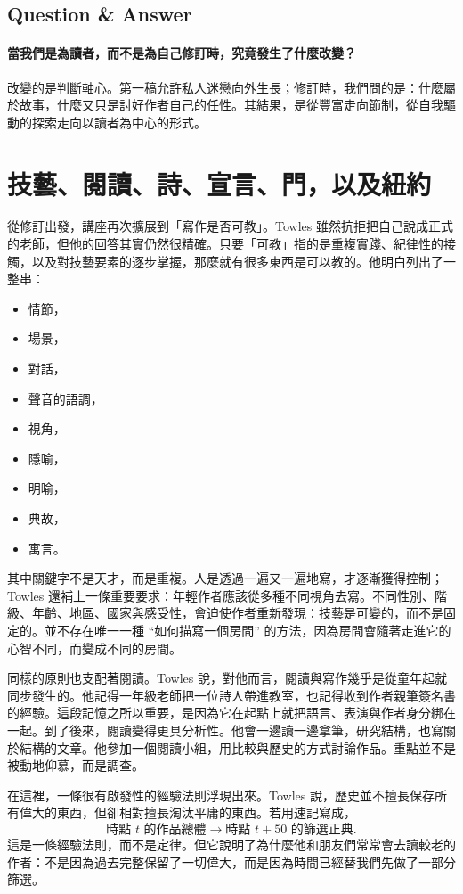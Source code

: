 \subsection{Question \& Answer}

\paragraph{當我們是為讀者，而不是為自己修訂時，究竟發生了什麼改變？}

改變的是判斷軸心。第一稿允許私人迷戀向外生長；修訂時，我們問的是：什麼屬於故事，什麼又只是討好作者自己的任性。其結果，是從豐富走向節制，從自我驅動的探索走向以讀者為中心的形式。

\section{技藝、閱讀、詩、宣言、門，以及紐約}

從修訂出發，講座再次擴展到「寫作是否可教」。Towles 雖然抗拒把自己說成正式的老師，但他的回答其實仍然很精確。只要「可教」指的是重複實踐、紀律性的接觸，以及對技藝要素的逐步掌握，那麼就有很多東西是可以教的。他明白列出了一整串：
\begin{itemize}
\item 情節，
\item 場景，
\item 對話，
\item 聲音的語調，
\item 視角，
\item 隱喻，
\item 明喻，
\item 典故，
\item 寓言。
\end{itemize}
其中關鍵字不是天才，而是重複。人是透過一遍又一遍地寫，才逐漸獲得控制；Towles 還補上一條重要要求：年輕作者應該從多種不同視角去寫。不同性別、階級、年齡、地區、國家與感受性，會迫使作者重新發現：技藝是可變的，而不是固定的。並不存在唯一一種 ``如何描寫一個房間'' 的方法，因為房間會隨著走進它的心智不同，而變成不同的房間。

同樣的原則也支配著閱讀。Towles 說，對他而言，閱讀與寫作幾乎是從童年起就同步發生的。他記得一年級老師把一位詩人帶進教室，也記得收到作者親筆簽名書的經驗。這段記憶之所以重要，是因為它在起點上就把語言、表演與作者身分綁在一起。到了後來，閱讀變得更具分析性。他會一邊讀一邊拿筆，研究結構，也寫關於結構的文章。他參加一個閱讀小組，用比較與歷史的方式討論作品。重點並不是被動地仰慕，而是調查。

在這裡，一條很有啟發性的經驗法則浮現出來。Towles 說，歷史並不擅長保存所有偉大的東西，但卻相對擅長淘汰平庸的東西。若用速記寫成，
\begin{equation}
\text{時點 } t \text{ 的作品總體} \longrightarrow \text{時點 } t+50 \text{ 的篩選正典}.
\end{equation}
這是一條經驗法則，而不是定律。但它說明了為什麼他和朋友們常常會去讀較老的作者：不是因為過去完整保留了一切偉大，而是因為時間已經替我們先做了一部分篩選。

